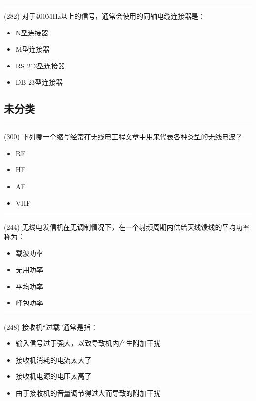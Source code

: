 \documentclass[twocolumn,hyperref,UTF8]{ctexart}  %
\begin{document}
\noindent\rule{0.5\textwidth}{1pt}
\heiti (282) 对于400MHz以上的信号，通常会使用的同轴电缆连接器是： \songti {\color{gray} [LK1222] }
\begin{itemize}
	\item  N型连接器
	\item  M型连接器
	\item  RS-213型连接器
	\item  DB-23型连接器
\end{itemize}









\clearpage
\subsection{未分类}




\noindent\rule{0.5\textwidth}{1pt}
\heiti (300) 下列哪一个缩写经常在无线电工程文章中用来代表各种类型的无线电波？ \songti {\color{gray} [LK1143] }
\begin{itemize}
	\item  RF
	\item  HF
	\item  AF
	\item  VHF
\end{itemize}


\noindent\rule{0.5\textwidth}{1pt}
\heiti (244) 无线电发信机在无调制情况下，在一个射频周期内供给天线馈线的平均功率称为： \songti {\color{gray} [LK1044] }
\begin{itemize}
	\item  载波功率
	\item  无用功率
	\item  平均功率
	\item  峰包功率
\end{itemize}


\noindent\rule{0.5\textwidth}{1pt}
\heiti (248) 接收机“过载”通常是指： \songti {\color{gray} [LK1180] }
\begin{itemize}
	\item  输入信号过于强大，以致导致机内产生附加干扰
	\item  接收机消耗的电流太大了
	\item  接收机电源的电压太高了
	\item  由于接收机的音量调节得过大而导致的附加干扰
\end{itemize}
\end{document}
